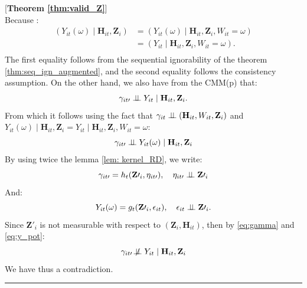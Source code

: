 \documentclass[10pt]{article} %
\newcommand{\BlackBox}{\rule{1.5ex}{1.5ex}}  %
\renewenvironment{proof}{\par\noindent{\bf Proof\ }}{\hfill\BlackBox\\[2mm]}
\newenvironment{proof}{\par\noindent{\bf Proof\ }}{\hfill\BlackBox\\[2mm]}
\begin{document}
\begin{proof}[\textbf{Theorem \ref{thm:valid_Z}}]
\begin{equation*}
\end{equation*}
Because : 
\begin{equation*}
\begin{aligned}
    (Y_{it}(\omega) \mid \mathbf{H}_{it}, \mathbf{Z}_i) &= (Y_{it}(\omega) \mid \mathbf{H}_{it}, \mathbf{Z}_i, W_{it} = \omega)     \\
 &= (Y_{it} \mid \mathbf{H}_{it}, \mathbf{Z}_i, W_{it} = \omega).\\
\end{aligned}
\end{equation*}
The first equality follows from the sequential ignorability of the theorem \ref{thm:seq_ign_augmented}, and the second equality follows the consistency assumption.
 On the other hand, we also have from the CMM(p) that: 
 \begin{equation*}
     \gamma_{it\prime} \perp \!\!\! \perp Y_{it} \mid \mathbf{H}_{it}, \mathbf{Z}_i.
 \end{equation*}
From which it follows using the fact that $\gamma_{it} \perp \!\!\! \perp (\mathbf{H}_{it}, W_{it}, \mathbf{Z}_i)$ and $Y_{it}(\omega) \mid \mathbf{H}_{it}, \mathbf{Z}_i = Y_{it} \mid \mathbf{H}_{it}, \mathbf{Z}_i, W_{it} = \omega $: 
\begin{equation*}
    \gamma_{it\prime} \perp \!\!\! \perp Y_{it}(\omega) \mid \mathbf{H}_{it}, \mathbf{Z}_i
\end{equation*}
By using twice the lemma \ref{lem: kernel_RD}, we write: 
\begin{equation}
    \gamma_{it\prime} = h_t(\mathbf{Z}\prime_i, \eta_{it\prime}), \quad \eta_{it\prime} \perp \!\!\! \perp  \mathbf{Z}\prime_i
\label{eq:gamma}
\end{equation}
And: 
\begin{equation}
    Y_{it}(\omega) = g_t(\mathbf{Z}\prime_i, \epsilon_{it}), \quad \epsilon_{it} \perp \!\!\! \perp  \mathbf{Z}\prime_i.
\label{eq:y_pot}
\end{equation}
Since $ \mathbf{Z}\prime_i$ is not measurable with respect to $( \mathbf{Z}_i, \mathbf{H}_{it})$, then by \eqref{eq:gamma} and \eqref{eq:y_pot}: 
\begin{equation*}
    \gamma_{it\prime} \not\!\perp\!\!\!\perp Y_{it} \mid \mathbf{H}_{it}, \mathbf{Z}_i
\end{equation*}
We have thus a contradiction.
\end{proof}
\end{document}
